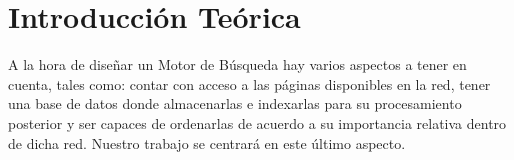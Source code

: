 \documentclass[a4paper]{article}
\begin{document}
\thispagestyle{empty}

\maketitle
\newpage

\thispagestyle{empty}
\vfill
\begin{abstract}
Habi\'endonos siendo dada la problem\'atica de c\'omo posicionar una p\'agina web alta en una b\'usqueda online, utilizando tres m\'etodos de ordenamiento de p\'aginas basados en links, este trabajo desarrolla distintas experimentaciones para la observaci\'on del comportamiento de los m\'etodos y de este modo saber cu\'al ser\'ia la tarea a llevar a cabo. \\
\\
\\
\indent \indent \textbf{Palabras claves} \\
\\
$\circ$ Matriz Esparsa \\
$\circ$ PageRank \\
$\circ$ HITS \\
$\circ$ In-deg \\

\end{abstract}

\thispagestyle{empty}
\vspace{3cm}
\tableofcontents
\newpage


\newpage

\section{Introducci\'on Te\'orica}

A la hora de dise\~nar un Motor de B\'usqueda hay varios aspectos a tener en cuenta, tales como: contar con acceso a las p\'aginas disponibles en la red, tener una base de datos donde almacenarlas e indexarlas para su procesamiento posterior y ser capaces de ordenarlas de acuerdo a su importancia relativa dentro de dicha red. Nuestro trabajo se centrar\'a en este \'ultimo aspecto.
\end{document}
